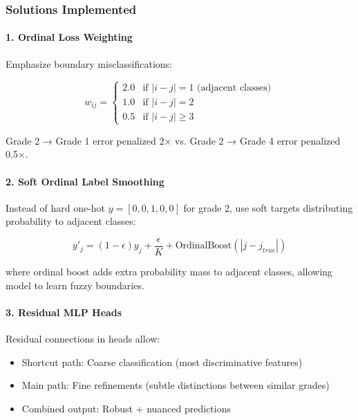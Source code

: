 \documentclass[12pt,a4paper]{article}
\begin{document}
\subsubsection{Solutions Implemented}

\paragraph{1. Ordinal Loss Weighting}

Emphasize boundary misclassifications:

\begin{equation}
w_{ij} = \begin{cases}
2.0 & \text{if } |i - j| = 1 \text{ (adjacent classes)} \\
1.0 & \text{if } |i - j| = 2 \\
0.5 & \text{if } |i - j| \geq 3
\end{cases}
\end{equation}

Grade 2 → Grade 1 error penalized 2× vs. Grade 2 → Grade 4 error penalized 0.5×.

\paragraph{2. Soft Ordinal Label Smoothing}

Instead of hard one-hot $y = [0, 0, 1, 0, 0]$ for grade 2, use soft targets distributing probability to adjacent classes:

\begin{equation}
y'_j = (1 - \epsilon) y_j + \frac{\epsilon}{K} + \text{OrdinalBoost}(|j - j_{true}|)
\end{equation}

where ordinal boost adds extra probability mass to adjacent classes, allowing model to learn fuzzy boundaries.

\paragraph{3. Residual MLP Heads}

Residual connections in heads allow:
\begin{itemize}
    \item Shortcut path: Coarse classification (most discriminative features)
    \item Main path: Fine refinements (subtle distinctions between similar grades)
    \item Combined output: Robust + nuanced predictions
\end{itemize}
\end{document}
